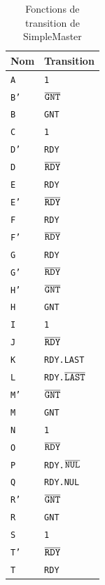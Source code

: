 \documentclass{article}
\begin{document}
\begin{table}[H]
\centering
\begingroup
\setlength{\tabcolsep}{5pt}
\renewcommand{\arraystretch}{1.1}
\begin{minipage}{.2\linewidth}
\centering
\caption{Fonctions de transition de SimpleMaster}
\begin{tabular}{ | l | l | }
\hline
Nom    &   Transition  \\
\hline
\tt{A}  & \tt{1} \\
\tt{B'} & \tt{$\overline{\tt{GNT}}$} \\
\tt{B}  & \tt{GNT} \\
\hline
\tt{C}  & \tt{1} \\
\tt{D'} & \tt{RDY} \\
\tt{D}  & \tt{$\overline{\tt{RDY}}$} \\
\tt{E}  & \tt{RDY} \\
\tt{E'} & \tt{$\overline{\tt{RDY}}$} \\
\tt{F}  & \tt{RDY} \\
\tt{F'} & \tt{$\overline{\tt{RDY}}$} \\
\tt{G}  & \tt{RDY} \\
\tt{G'} & \tt{$\overline{\tt{RDY}}$} \\
\hline
\tt{H'} & \tt{$\overline{\tt{GNT}}$} \\
\tt{H}  & \tt{GNT} \\
\tt{I}  & \tt{1} \\
\tt{J}  & \tt{$\overline{\tt{RDY}}$} \\
\tt{K}  & \tt{RDY.LAST} \\
\tt{L}  & \tt{RDY.$\overline{\tt{LAST}}$} \\
\hline
\tt{M'} & \tt{$\overline{\tt{GNT}}$} \\
\tt{M}  & \tt{GNT} \\
\tt{N}  & \tt{1} \\
\tt{O}  & \tt{$\overline{\tt{RDY}}$} \\
\tt{P}  & \tt{RDY.$\overline{\tt{NUL}}$} \\
\tt{Q}  & \tt{RDY.NUL} \\
\hline
\tt{R'} & \tt{$\overline{\tt{GNT}}$} \\
\tt{R}  & \tt{GNT} \\
\tt{S}  & \tt{1} \\
\tt{T'} & \tt{$\overline{\tt{RDY}}$} \\
\tt{T}  & \tt{RDY} \\
\hline
\end{tabular}
\end{minipage}

\end{table}
\end{document}
